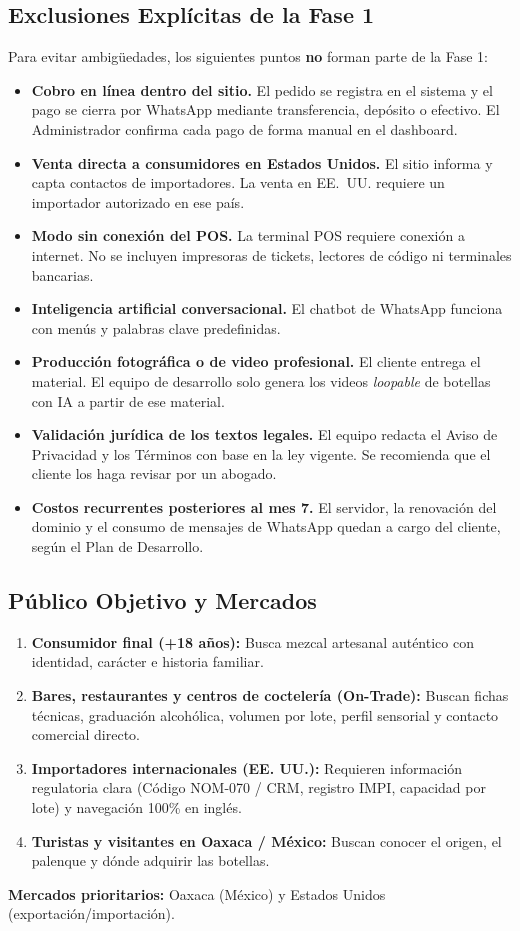 \documentclass[11pt,letterpaper]{article}
\begin{document}
\subsection{Exclusiones Explícitas de la Fase 1}
Para evitar ambigüedades, los siguientes puntos \textbf{no} forman parte de la Fase 1:
\begin{itemize}[leftmargin=1.5em]
    \item \textbf{Cobro en línea dentro del sitio.} El pedido se registra en el sistema y el pago se cierra por WhatsApp mediante transferencia, depósito o efectivo. El Administrador confirma cada pago de forma manual en el dashboard.
    \item \textbf{Venta directa a consumidores en Estados Unidos.} El sitio informa y capta contactos de importadores. La venta en EE.~UU. requiere un importador autorizado en ese país.
    \item \textbf{Modo sin conexión del POS.} La terminal POS requiere conexión a internet. No se incluyen impresoras de tickets, lectores de código ni terminales bancarias.
    \item \textbf{Inteligencia artificial conversacional.} El chatbot de WhatsApp funciona con menús y palabras clave predefinidas.
    \item \textbf{Producción fotográfica o de video profesional.} El cliente entrega el material. El equipo de desarrollo solo genera los videos \textit{loopable} de botellas con IA a partir de ese material.
    \item \textbf{Validación jurídica de los textos legales.} El equipo redacta el Aviso de Privacidad y los Términos con base en la ley vigente. Se recomienda que el cliente los haga revisar por un abogado.
    \item \textbf{Costos recurrentes posteriores al mes 7.} El servidor, la renovación del dominio y el consumo de mensajes de WhatsApp quedan a cargo del cliente, según el Plan de Desarrollo.
\end{itemize}

\subsection{Público Objetivo y Mercados}
\begin{enumerate}[leftmargin=1.5em]
    \item \textbf{Consumidor final (+18 años):} Busca mezcal artesanal auténtico con identidad, carácter e historia familiar.
    \item \textbf{Bares, restaurantes y centros de coctelería (On-Trade):} Buscan fichas técnicas, graduación alcohólica, volumen por lote, perfil sensorial y contacto comercial directo.
    \item \textbf{Importadores internacionales (EE. UU.):} Requieren información regulatoria clara (Código NOM-070 / CRM, registro IMPI, capacidad por lote) y navegación 100\% en inglés.
    \item \textbf{Turistas y visitantes en Oaxaca / México:} Buscan conocer el origen, el palenque y dónde adquirir las botellas.
\end{enumerate}
\textbf{Mercados prioritarios:} Oaxaca (México) y Estados Unidos (exportación/importación).
\end{document}
